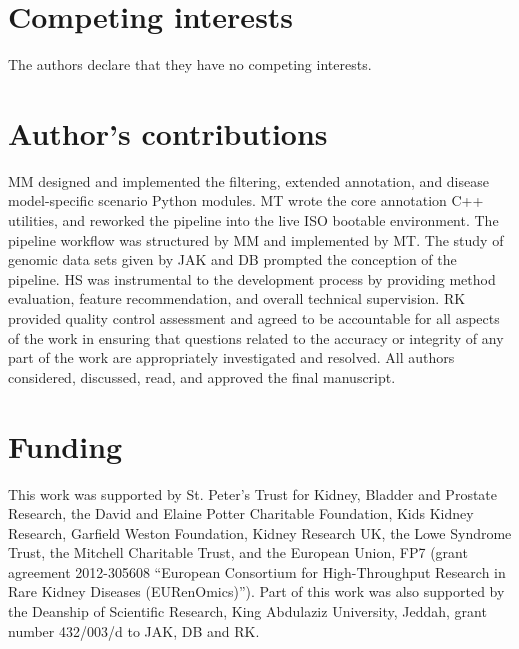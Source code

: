 \documentclass[twocolumn]{bmcart}%
\begin{document}
\begin{backmatter}
\section*{Competing interests}
The authors declare that they have no competing interests.

\section*{Author's contributions}
MM designed and implemented the filtering, extended annotation, and disease model-specific scenario Python modules. MT wrote the core annotation C++ utilities, and reworked the pipeline into the live ISO bootable environment. The pipeline workflow was structured by MM and implemented by MT. The study of genomic data sets given by JAK and DB prompted the conception of the pipeline. HS was instrumental to the development process by providing method evaluation, feature recommendation, and overall technical supervision. RK provided quality control assessment and agreed to be accountable for all aspects of the work in ensuring that questions related to the accuracy or integrity of any part of the work are appropriately investigated and resolved. All authors considered, discussed, read, and approved the final manuscript.



\section*{Funding}
This work was supported by St. Peter's Trust for Kidney, Bladder and Prostate Research, the David and Elaine Potter Charitable Foundation, Kids Kidney Research, Garfield Weston Foundation, Kidney Research UK, the Lowe Syndrome Trust, the Mitchell Charitable Trust, and the European Union, FP7 (grant agreement 2012-305608 ``European Consortium for High-Throughput Research in Rare Kidney Diseases (EURenOmics)''). Part of this work was also supported by the Deanship of Scientific Research, King Abdulaziz University, Jeddah, grant number 432/003/d to JAK, DB and RK.




\end{backmatter}
\end{document}
